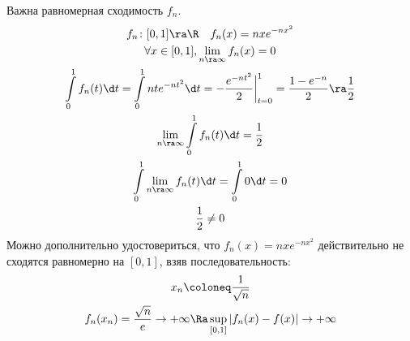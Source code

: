 \begin{exmp}
	Важна равномерная сходимость $f_n$.
	\begin{gather*}
		f_n\colon [0,1] \ra \R \quad f_n(x) = nxe^{-nx^2} \\
		\forall x \in [0, 1], \lim_{n \ra \infty} f_n(x) = 0 \\
		\int\limits_0^1 f_n(t) \d t = \int\limits_0^1 nte^{-nt^2} \d t = -\frac{e^{-nt^2}}2\biggr|_{t=0}^1 = \frac{1-e^{-n}}2 \ra \frac12 \\
		\lim_{n \ra \infty} \int\limits_0^1 f_n(t) \d t
		= \frac12 \\
		\int\limits_0^1 \lim_{n \ra \infty} f_n(t) \d t
		= \int\limits_0^1 0 \d t
		= 0\\
		\frac 1 2 \neq 0
	\end{gather*}
	Можно дополнительно удостовериться, что $f_n(x)=nxe^{-nx^2}$ действительно не сходятся равномерно на $[0,1]$, взяв последовательность:
	\begin{gather*}
		x_n \coloneq \frac{1}{\sqrt n} \\
		f_n(x_n) = \frac{\sqrt n}{e} \to +\infty
		\Ra
		\sup_{[0, 1]} |f_n(x) - f(x)| \to +\infty
	\end{gather*}
\end{exmp}